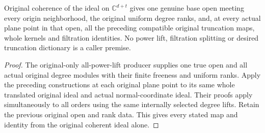 \begin{theorem}
\label{hir:relative-normal-original-nearby-compatible-power-truncations}
\leanok
Original coherence of the ideal on $\mathbb C^{d+t}$ gives one genuine
base open meeting every origin neighborhood, the original uniform
degree ranks, and, at every actual plane point in that open, all the
preceding compatible original truncation maps, whole kernels and
filtration identities. No power lift, filtration splitting or desired
truncation dictionary is a caller premise.
\end{theorem}
\begin{proof}
The original-only all-power-lift producer supplies one true open and
all actual original degree modules with their finite freeness and
uniform ranks. Apply the preceding constructions at each original
plane point to its same whole translated original ideal and actual
normal-coordinate ideal. Their proofs apply simultaneously to all
orders using the same internally selected degree lifts. Retain the
previous original open and rank data. This gives every stated map
and identity from the original coherent ideal alone.
\end{proof}
